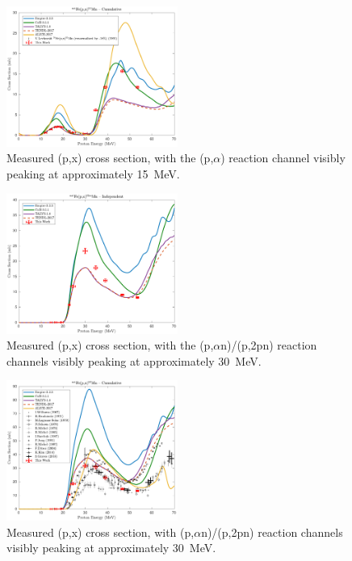 \begin{figure}
 \centering
 \includegraphics[width=0.5\textwidth]{./figures/51Mn.pdf}
 \caption{Measured (p,x) cross section, with the (p,$\alpha$) reaction channel visibly peaking at approximately \mbox{15 MeV}.}
 \label{fig:51Mn}
\end{figure}




\begin{figure}
 \centering
 \includegraphics[width=0.5\textwidth]{./figures/52mMn.pdf}
 \caption{Measured (p,x) cross section, with the (p,$\alpha$n)/(p,2pn) reaction channels visibly peaking at approximately \mbox{30 MeV}.}
 \label{fig:temp_52mMn}
\end{figure}


\begin{figure}
 \centering
 \includegraphics[width=0.5\textwidth]{./figures/52Mn.pdf}
 \caption{Measured (p,x) cross section, with (p,$\alpha$n)/(p,2pn) reaction channels visibly peaking at approximately \mbox{30 MeV}.}
 \label{fig:temp_52Mn}
\end{figure}



